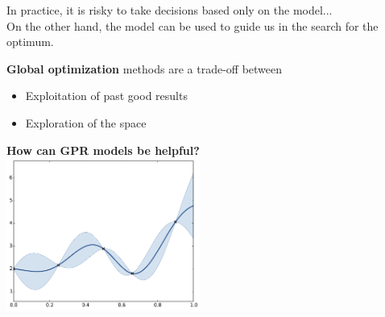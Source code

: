 \begin{frame}{}
\begin{figure}
    \end{figure}
In practice, it is risky to take decisions based only on the model...\\
\vspace{3mm}
On the other hand, the model can be used to guide us in the search for the optimum.
\end{frame}

\begin{frame}{}
\textbf{Global optimization} methods are a trade-off between
\begin{itemize}
	\item Exploitation of past good results
	\item Exploration of the space
\end{itemize}
\vspace{3mm}
\begin{center}
\textbf{How can GPR models be helpful?}\\
\includegraphics[height=5cm]{4_optimization/figures/python/ego_0}
\end{center}
\end{frame}

